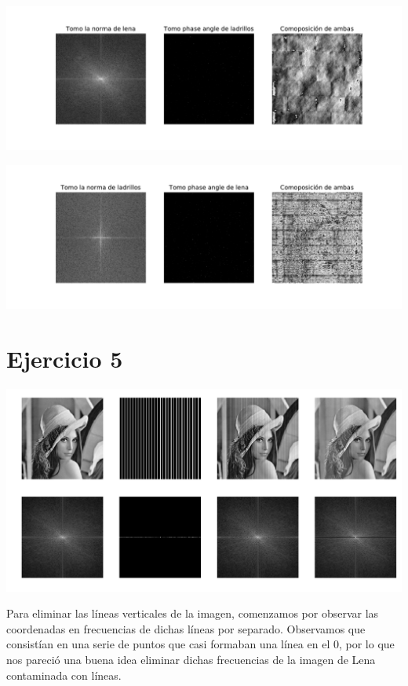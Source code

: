 \documentclass[a4paper]{article}
\begin{document}
\begin{center}

\includegraphics[scale=0.6]{imgs/4a.pdf}

\includegraphics[scale=0.6]{imgs/4b.pdf}
\end{center}

\section{Ejercicio 5}
\begin{center}

	\includegraphics[scale=0.4]{imgs/ej5.png}
\end{center}

Para eliminar las líneas verticales de la imagen, comenzamos por observar las coordenadas en frecuencias de dichas líneas por separado. Observamos que consistían en una serie de puntos que casi formaban una línea en el $0$, por lo que nos pareció una buena idea eliminar dichas frecuencias de la imagen de Lena contaminada con líneas.
\end{document}
